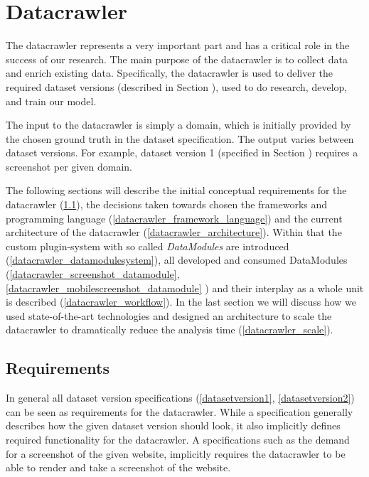 \section{Datacrawler}
\label{Datacrawler}
The datacrawler represents a very important part and has a critical role in the success of our research. The main purpose of the datacrawler is to collect data and enrich existing data. Specifically, the datacrawler is used to deliver the required dataset versions (described in Section \label{dataset} ), used to do research, develop, and train our model.

The input to the datacrawler is simply a domain, which is initially provided by the chosen ground truth in the dataset specification. The output varies between dataset versions. For example, dataset version 1 (specified in Section \label{datasetversion1})  requires a screenshot per given domain.

The following sections will describe the initial conceptual requirements for the datacrawler (\ref{datacrawler_requirements}), the decisions taken towards chosen the frameworks and programming language (\ref{datacrawler_framework_language}) and the current architecture of the datacrawler (\ref{datacrawler_architecture}). Within that the custom plugin-system with so called \textit{DataModules} are introduced (\ref{datacrawler_datamodulesystem}), all developed and consumed DataModules (\ref{datacrawler_screenshot_datamodule}, \ref{datacrawler_mobilescreenshot_datamodule} ) and their interplay as a whole unit is described (\ref{datacrawler_workflow}).  In the last section we will discuss how we used state-of-the-art technologies and designed an architecture to scale the datacrawler to dramatically reduce the analysis time (\ref{datacrawler_scale}).

\subsection{Requirements}
\label{datacrawler_requirements}
In general all dataset version specifications (\ref{datasetversion1}, \ref{datasetversion2}) can be seen as requirements for the datacrawler. While a specification generally describes how the given dataset version should look, it also implicitly defines required functionality for the datacrawler. A specifications such as the demand for a screenshot of the given website, implicitly requires the datacrawler to be able to render and take a screenshot of the website.

